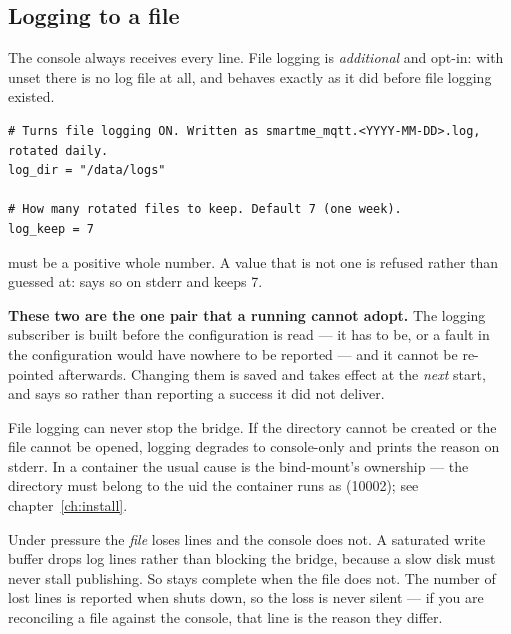 \subsection{Logging to a file}

The console always receives every line. File logging is \emph{additional} and opt-in: with
 unset there is no log file at all, and \prog behaves exactly as it did
before file logging existed.

\begin{lstlisting}
# Turns file logging ON. Written as smartme_mqtt.<YYYY-MM-DD>.log, rotated daily.
log_dir = "/data/logs"

# How many rotated files to keep. Default 7 (one week).
log_keep = 7
\end{lstlisting}

 must be a positive whole number. A value that is not one is refused rather
than guessed at: \prog says so on stderr and keeps 7.

\begin{warning}
\textbf{These two are the one pair that a running \prog cannot adopt.} The logging
subscriber is built before the configuration is read --- it has to be, or a fault in the
configuration would have nowhere to be reported --- and it cannot be re-pointed afterwards.
Changing them is saved and takes effect at the \emph{next} start, and \prog says so rather
than reporting a success it did not deliver.
\end{warning}

\begin{note}
File logging can never stop the bridge. If the directory cannot be created or the file
cannot be opened, logging degrades to console-only and prints the reason on stderr. In a
container the usual cause is the bind-mount's ownership --- the directory must belong to the
uid the container runs as (10002); see chapter~\ref{ch:install}.
\end{note}

\begin{warning}
Under pressure the \emph{file} loses lines and the console does not. A saturated write
buffer drops log lines rather than blocking the bridge, because a slow disk must never
stall publishing. So  stays complete when the file does not. The
number of lost lines is reported when \prog shuts down, so the loss is never silent --- if
you are reconciling a file against the console, that line is the reason they differ.
\end{warning}


